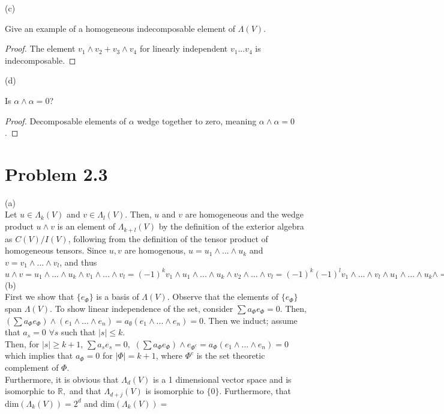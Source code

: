 \documentclass[paper=a4, fontsize=11pt]{scrartcl} %
\numberwithin{equation}{section} %
\numberwithin{figure}{section} %
\numberwithin{table}{section} %
\begin{document}
(c)

Give an example of a homogeneous indecomposable element of $\Lambda(V)$.

\begin{proof}
The element $v_1 \wedge v_2 + v_3 \wedge v_4$ for linearly independent $v_1...v_4$ is indecomposable.
\end{proof}

(d)

Is $\alpha \wedge \alpha = 0$?

\begin{proof}
Decomposable elements of $\alpha$ wedge together to zero, meaning $\alpha \wedge \alpha = 0$.
\end{proof}

\section*{Problem 2.3}

(a) \\ Let $u \in \Lambda_k (V)$ and $v \in \Lambda_l (V)$. Then, $u$ and $v$ are homogeneous and the wedge product $u \wedge v$ is an element of $\Lambda_{k+l} (V)$ by the definition of the exterior algebra as $C(V)/I(V)$, following from the definition of the tensor product of homogeneous tensors. Since $u,v$ are homogenous, $u = u_1 \wedge ...\wedge u_k$ and $v = v_1 \wedge ...\wedge v_l$, and thus $u \wedge v = u_1 \wedge ...\wedge u_k \wedge v_1 \wedge ...\wedge v_l = (-1)^k v_1 \wedge u_1 \wedge ...\wedge u_k \wedge v_2 \wedge ...\wedge v_l = (-1)^k (-1)^l v_1 \wedge ...\wedge v_l \wedge u_1 \wedge ...\wedge u_k \wedge = (-1)^{kl} v \wedge u$ \\

(b) \\ First we show that $\{e_{\Phi}\}$ is a basis of $\Lambda(V)$. Observe that the elements of $\{e_{\Phi}\}$ span $\Lambda(V)$. To show linear independence of the set, consider $\sum a_\Phi e_\Phi = 0$. Then, $(\sum a_\Phi e_\Phi) \wedge (e_1 \wedge ... \wedge e_n) = a_{\emptyset}(e_1 \wedge ... \wedge e_n) = 0.$ Then we induct; assume that $a_s = 0$ $\forall s$ such that $|s| \leq k$. \\
Then, for $|s| \geq k+1$,  $\sum a_s e_s = 0, $  $(\sum a_\Phi e_\Phi) \wedge e_{\Phi^c} = a_{\Phi}(e_1 \wedge ...\wedge e_n) = 0$ which implies that $a_\Phi = 0$ for $|\Phi| = k+1$, where $\Phi^c$ is the set theoretic complement of $\Phi$. \\

Furthermore, it is obvious that $\Lambda_d(V)$ is a 1 dimensional vector space and is isomorphic to $\mathbb{R},$ and that $\Lambda_{d+j}(V)$ is isomorphic to $\{0\}$. Furthermore, that dim$(\Lambda_k(V)) = 2^d$ and dim$(\Lambda_k(V)) = $
\end{document}
